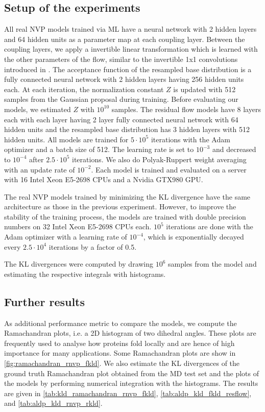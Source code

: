 \documentclass[twoside]{article}
\begin{document}
\subsection{Setup of the experiments}
\label{sec:aldp_setup}

All real NVP models trained via ML have a neural network with 2 hidden layers and 64 hidden units as a parameter map at each coupling layer. Between the coupling layers, we apply a invertible linear transformation which is learned with the other parameters of the flow, similar to the invertible 1x1 convolutions introduced in \citep{Kingma2018}. The acceptance function of the resampled base distribution is a fully connected neural network with 2 hidden layers having 256 hidden units each. At each iteration, the normalization constant $Z$ is updated with 512 samples from the Gaussian proposal during training. Before evaluating our models, we estimated $Z$ with $10^{10}$ samples. The residual flow models have 8 layers each with each layer having 2 layer fully connected neural network with 64 hidden units and the resampled base distribution has 3 hidden layers with 512 hidden units. All models are trained for $5\cdot10^5$ iterations with the Adam optimizer \citep{Kingma2015} and a batch size of 512. The learning rate is set to $10^{-3}$ and decreased to $10^{-4}$ after $2.5\cdot10^5$ iterations. We also do Polyak-Ruppert weight averaging \citep{Polyak1990,Ruppert1988} with an update rate of $10^{-2}$. Each model is trained and evaluated on a server with 16 Intel Xeon E5-2698 CPUs and a Nvidia GTX980 GPU.

The real NVP models trained by minimizing the KL divergence have the same architecture as those in the previous experiment. However, to improve the stability of the training process, the models are trained with double precision numbers on 32 Intel Xeon E5-2698 CPUs each. $10^5$ iterations are done with the Adam optimizer with a learning rate of $10^{-4}$, which is exponentially decayed every $2.5\cdot10^4$ iterations by a factor of 0.5.

The KL divergences were computed by drawing $10^6$ samples from the model and estimating the respective integrals with histograms.


\subsection{Further results}
\label{sec:aldp_further_results}

As additional performance metric to compare the models, we compute the Ramachandran plots, i.e. a 2D histogram of two dihedral angles. These plots are frequently used to analyse how proteins fold locally and are hence of high importance for many applications. Some Ramachandran plots are show in \autoref{fig:ramachandran_rnvp_fkld}. We also estimate the KL divergences of the ground truth Ramachandran plot obtained from the MD test set and the plots of the models by performing numerical integration with the histograms. The results are given in \autoref{tab:kld_ramachandran_rnvp_fkld}, \autoref{tab:aldp_kld_fkld_resflow}, and \autoref{tab:aldp_kld_rnvp_rkld}.
\end{document}
